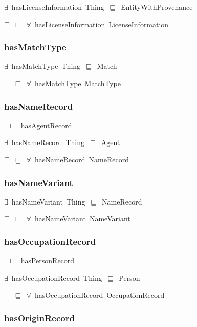 \documentclass{article}
\begin{document}
\ensuremath{\exists}~hasLicenseInformation~Thing~\ensuremath{\sqsubseteq}~EntityWithProvenance

\ensuremath{\top}~\ensuremath{\sqsubseteq}~\ensuremath{\forall}~hasLicenseInformation~LicenseInformation

\subsubsection*{hasMatchType}

\ensuremath{\exists}~hasMatchType~Thing~\ensuremath{\sqsubseteq}~Match

\ensuremath{\top}~\ensuremath{\sqsubseteq}~\ensuremath{\forall}~hasMatchType~MatchType

\subsubsection*{hasNameRecord}

~\ensuremath{\sqsubseteq}~hasAgentRecord

\ensuremath{\exists}~hasNameRecord~Thing~\ensuremath{\sqsubseteq}~Agent

\ensuremath{\top}~\ensuremath{\sqsubseteq}~\ensuremath{\forall}~hasNameRecord~NameRecord

\subsubsection*{hasNameVariant}

\ensuremath{\exists}~hasNameVariant~Thing~\ensuremath{\sqsubseteq}~NameRecord

\ensuremath{\top}~\ensuremath{\sqsubseteq}~\ensuremath{\forall}~hasNameVariant~NameVariant

\subsubsection*{hasOccupationRecord}

~\ensuremath{\sqsubseteq}~hasPersonRecord

\ensuremath{\exists}~hasOccupationRecord~Thing~\ensuremath{\sqsubseteq}~Person

\ensuremath{\top}~\ensuremath{\sqsubseteq}~\ensuremath{\forall}~hasOccupationRecord~OccupationRecord

\subsubsection*{hasOriginRecord}
\end{document}
